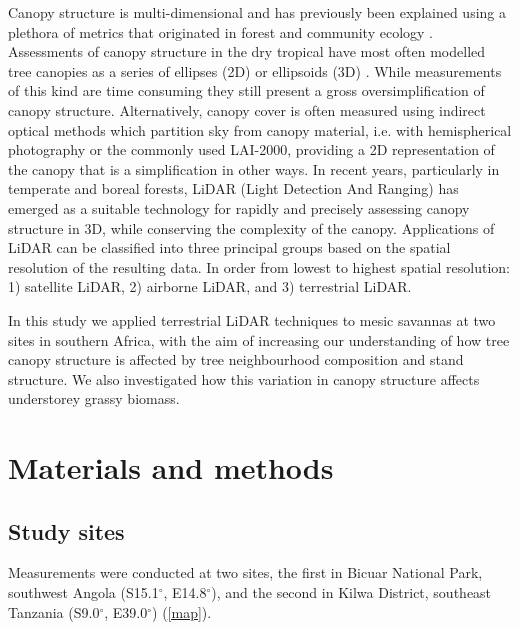\documentclass[11pt,a4paper]{article}
\begin{document}
Canopy structure is multi-dimensional and has previously been explained using a plethora of metrics that originated in forest and community ecology \citep{}. Assessments of canopy structure in the dry tropical have most often modelled tree canopies as a series of ellipses (2D) or ellipsoids (3D) \citep{}. While measurements of this kind are time consuming they still present a gross oversimplification of canopy structure. Alternatively, canopy cover is often measured using indirect optical methods which partition sky from canopy material, i.e. with hemispherical photography or the commonly used LAI-2000, providing a 2D representation of the canopy that is a simplification in other ways. In recent years, particularly in temperate and boreal forests, LiDAR (Light Detection And Ranging) has emerged as a suitable technology for rapidly and precisely assessing canopy structure in 3D, while conserving the complexity of the canopy. Applications of LiDAR can be classified into three principal groups based on the spatial resolution of the resulting data. In order from lowest to highest spatial resolution: 1) satellite LiDAR, 2) airborne LiDAR, and 3) terrestrial LiDAR.

In this study we applied terrestrial LiDAR techniques to mesic savannas at two sites in southern Africa, with the aim of increasing our understanding of how tree canopy structure is affected by tree neighbourhood composition and stand structure. We also investigated how this variation in canopy structure affects understorey grassy biomass. 

\section{Materials and methods}

\subsection{Study sites}

Measurements were conducted at two sites, the first in Bicuar National Park, southwest Angola (S15.1$^\circ$, E14.8$^\circ$), and the second in Kilwa District, southeast Tanzania (S9.0$^\circ$, E39.0$^\circ$) (\autoref{map}).
\end{document}
